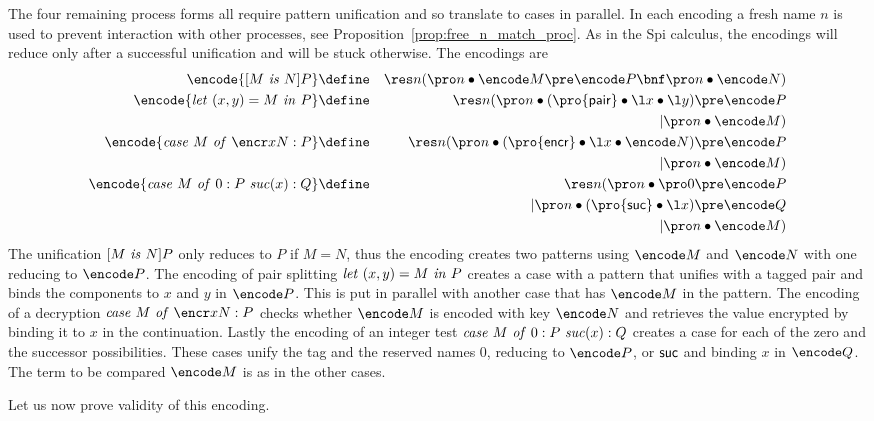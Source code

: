 \documentclass{LMCS}
\begin{document}
The four remaining process forms all require pattern unification and so
translate to cases in parallel. In each encoding a fresh name $n$ is
used to prevent interaction with other processes, see
Proposition~\ref{prop:free_n_match_proc}. As in the Spi calculus,
the encodings will reduce only after a successful unification and will be
stuck otherwise. The encodings are
\begin{eqnarray*}
\encode {[M\ {\it is}\ N]P} &\define&
            \res n (\pro n\bullet \encode M\pre \encode P \bnf \pro
n\bullet \encode N)\\
\encode {{\it let}\ (x,y)= M\ {\it in}\ P} &\define&
            \res n (\pro n \bullet (\pro {{\sf pair}}\bullet\l x\bullet
\l y)\pre \encode P\\
    & & \quad\quad    |    \pro n\bullet \encode M)\\
\encode {{\it case}\ M\ {\it of}\ \encr x N:P} &\define&
            \res n (\pro n \bullet (\pro {{\sf encr}}\bullet\l x\bullet
\encode N)\pre \encode P\\
    & & \quad\quad    |    \pro n\bullet \encode M)\\
\encode {{\it case}\ M\ {\it of}\ 0:P\ {\it suc}(x):Q} &\define&
            \res n (\pro n\bullet \pro 0\pre \encode P \\
    & & \quad\quad    |    \pro n\bullet (\pro {{\sf suc}}\bullet \l
x)\pre \encode Q \\
    & & \quad\quad    |    \pro n\bullet \encode M )
\end{eqnarray*}
The unification $[M\ {\it is}\ N]P$ only reduces to $P$ if $M=N$, thus the
encoding creates two patterns using $\encode M$ and $\encode
N$ with one reducing to $\encode P$.  The encoding of pair splitting ${\it let}\ (x,y)= M\ {\it in}\ P$ 
creates a case with a pattern that unifies with a tagged pair and binds the
components to $x$ and $y$ in $\encode P$. This is put in parallel with
another case that has $\encode M$ in the pattern. The encoding of a decryption ${\it case}\ M\ {\it of}\ \encr x N:P$ checks
whether $\encode M$ is encoded with key $\encode N$ and
retrieves the value encrypted by binding it to $x$ in the continuation.
Lastly the encoding of an integer test ${\it case}\ M\ {\it of}\ 0:P\ {\it
suc}(x):Q$ creates a case for each of the zero and the
successor possibilities. These cases unify the tag and the reserved
names $0$, reducing to $\encode P$, or ${\sf suc}$ and binding $x$ in
$\encode Q$. The term to be compared $\encode M$ is as in the other cases.

Let us now prove validity of this encoding.
\end{document}
